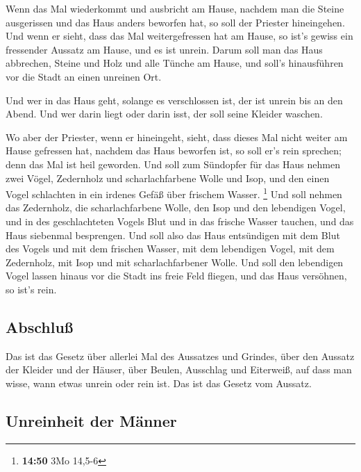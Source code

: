  Wenn das Mal wiederkommt und ausbricht am Hause, nachdem
man die Steine ausgerissen und das Haus anders beworfen hat,
 so soll der Priester hineingehen. Und wenn er sieht,
dass das Mal weitergefressen hat am Hause, so ist's gewiss ein
fressender Aussatz am Hause, und es ist unrein.  Darum
soll man das Haus abbrechen, Steine und Holz und alle Tünche am Hause,
und soll's hinausführen vor die Stadt an einen unreinen Ort.

 Und wer in das Haus geht, solange es verschlossen ist,
der ist unrein bis an den Abend.  Und wer darin liegt
oder darin isst, der soll seine Kleider waschen.

 Wo aber der Priester, wenn er hineingeht, sieht, dass
dieses Mal nicht weiter am Hause gefressen hat, nachdem das Haus
beworfen ist, so soll er's rein sprechen; denn das Mal ist heil
geworden.  Und soll zum Sündopfer für das Haus nehmen
zwei Vögel, Zedernholz und scharlachfarbene Wolle und Isop,
 und den einen Vogel schlachten in ein irdenes Gefäß über
frischem Wasser. \footnote{\textbf{14:50} 3Mo 14,5-6} 
Und soll nehmen das Zedernholz, die scharlachfarbene Wolle, den Isop und
den lebendigen Vogel, und in des geschlachteten Vogels Blut und in das
frische Wasser tauchen, und das Haus siebenmal besprengen.
 Und soll also das Haus entsündigen mit dem Blut des
Vogels und mit dem frischen Wasser, mit dem lebendigen Vogel, mit dem
Zedernholz, mit Isop und mit scharlachfarbener Wolle. 
Und soll den lebendigen Vogel lassen hinaus vor die Stadt ins freie Feld
fliegen, und das Haus versöhnen, so ist's rein.

\hypertarget{abschluuxdf}{%
\subsection{Abschluß}\label{abschluuxdf}}

 Das ist das Gesetz über allerlei Mal des Aussatzes und
Grindes,  über den Aussatz der Kleider und der Häuser,
 über Beulen, Ausschlag und Eiterweiß, 
auf dass man wisse, wann etwas unrein oder rein ist. Das ist das Gesetz
vom Aussatz.

\hypertarget{unreinheit-der-muxe4nner}{%
\subsection{Unreinheit der Männer}\label{unreinheit-der-muxe4nner}}

